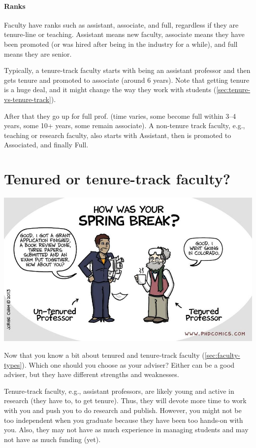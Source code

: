 \documentclass[oneside,11pt,dvipsnames]{book}
\begin{document}
\paragraph{Ranks} Faculty have ranks such as assistant, associate, and full, regardless if they are tenure-line or teaching.  Assistant means new faculty, associate means they have been promoted (or was hired after being in the industry for a while), and full means they are senior. 

Typically, a tenure-track faculty starts with being an assistant professor and then gets tenure and promoted to associate (around 6 years). Note that getting tenure is a huge deal, and it might change the way they work with students (\autoref{sec:tenure-vs-tenure-track}).

After that they go up for full prof. (time varies, some become full within 3--4 years, some 10+ years, some remain associate). A non-tenure track faculty, e.g., teaching or research faculty, also starts with Assistant, then is promoted to Associated, and finally Full.


\section{Tenured or tenure-track faculty?}\label{sec:tenure-vs-tenure-track}

\begin{center}
  \includegraphics[scale=0.4]{files/c8.png}
\end{center}

Now that you know a bit about tenured and tenure-track faculty (\autoref{sec:faculty-types}).  Which one should you choose as your adviser? 
Either can be a good adviser, but they have different strengths and weaknesses.


Tenure-track faculty, e.g., assistant professors, are likely young and active in research (they have to, to get tenure). Thus, they will devote more time to work with you and push you to do research and publish. However, you might not be too independent when you graduate because they have been too hands-on with you.  Also, they may not have as much experience in managing students and may not have as much funding (yet).
\end{document}
